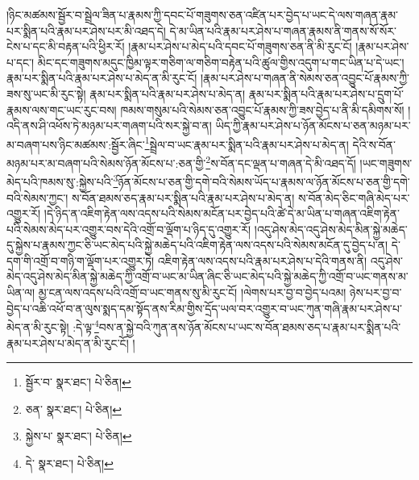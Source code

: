 །ཉིང་མཚམས་སྦྱོར་བ་སྦྲེལ་ཟིན་པ་རྣམས་ཀྱི་དབང་པོ་གཟུགས་ཅན་འཛིན་པར་བྱེད་པ་ཡང་དེ་ལས་གཞན་རྣམ་པར་སྨིན་པའི་རྣམ་པར་ཤེས་པར་མི་འཐད་དེ། དེ་མ་ཡིན་པའི་རྣམ་པར་ཤེས་པ་གཞན་རྣམས་ནི་གནས་སོ་སོར་ངེས་པ་དང་མི་བརྟན་པའི་ཕྱིར་རོ། །རྣམ་པར་ཤེས་པ་མེད་པའི་དབང་པོ་གཟུགས་ཅན་ནི་མི་རུང་ངོ། །རྣམ་པར་ཤེས་པ་དང་། མིང་དང་གཟུགས་མདུང་ཁྱིམ་ལྟར་གཅིག་ལ་གཅིག་བརྟེན་པའི་ཚུལ་གྱིས་འདུག་པ་གང་ཡིན་པ་དེ་ཡང་། རྣམ་པར་སྨིན་པའི་རྣམ་པར་ཤེས་པ་མེད་ན་མི་རུང་ངོ། །རྣམ་པར་ཤེས་པ་གཞན་ནི་སེམས་ཅན་འབྱུང་པོ་རྣམས་ཀྱི་ཟས་སུ་ཡང་མི་རུང་སྟེ། རྣམ་པར་སྨིན་པའི་རྣམ་པར་ཤེས་པ་མེད་ན། རྣམ་པར་སྨིན་པའི་རྣམ་པར་ཤེས་པ་དྲུག་པོ་རྣམས་ལས་གང་ཡང་རུང་བས། ཁམས་གསུམ་པའི་སེམས་ཅན་འབྱུང་པོ་རྣམས་ཀྱི་ཟས་བྱེད་པ་ནི་མི་དམིགས་སོ། །འདི་ནས་ཤི་འཕོས་ཏེ་མཉམ་པར་གཞག་པའི་སར་སྐྱེ་བ་ན། ཡིད་ཀྱི་རྣམ་པར་ཤེས་པ་ཉོན་མོངས་པ་ཅན་མཉམ་པར་མ་བཞག་པས་ཉིང་མཚམས་:སྦྱོར་ཞིང་\footnote{སྦྱོར་བ་  སྣར་ཐང་།  པེ་ཅིན། }སྦྲེལ་བ་ཡང་རྣམ་པར་སྨིན་པའི་རྣམ་པར་ཤེས་པ་མེད་ན། དེའི་ས་བོན་མཉམ་པར་མ་བཞག་པའི་སེམས་ཉོན་མོངས་པ་:ཅན་གྱི་\footnote{ཅན་  སྣར་ཐང་།  པེ་ཅིན། }ས་བོན་དང་ལྡན་པ་གཞན་དེ་མི་འཐད་དོ། །ཡང་གཟུགས་མེད་པའི་ཁམས་སུ་:སྐྱེས་པའི་\footnote{སྐྱེས་པ་  སྣར་ཐང་།  པེ་ཅིན། }ཉོན་མོངས་པ་ཅན་གྱི་དགེ་བའི་སེམས་ཡོད་པ་རྣམས་ལ་ཉོན་མོངས་པ་ཅན་གྱི་དགེ་བའི་སེམས་ཀྱང་། ས་བོན་ཐམས་ཅད་རྣམ་པར་སྨིན་པའི་རྣམ་པར་ཤེས་པ་མེད་ན། ས་བོན་མེད་ཅིང་གཞི་མེད་པར་འགྱུར་རོ། །དེ་ཉིད་ན་འཇིག་རྟེན་ལས་འདས་པའི་སེམས་མངོན་པར་བྱེད་པའི་ཚེ་དེ་མ་ཡིན་པ་གཞན་འཇིག་རྟེན་པའི་སེམས་མེད་པར་འགྱུར་བས་དེའི་འགྲོ་བ་ལྡོག་པ་ཉིད་དུ་འགྱུར་རོ། །འདུ་ཤེས་མེད་འདུ་ཤེས་མེད་མིན་སྐྱེ་མཆེད་དུ་སྐྱེས་པ་རྣམས་ཀྱང་ཅི་ཡང་མེད་པའི་སྐྱེ་མཆེད་པའི་འཇིག་རྟེན་ལས་འདས་པའི་སེམས་མངོན་དུ་བྱེད་པ་ན། དེ་དག་གི་འགྲོ་བ་གཉི་ག་ལྡོག་པར་འགྱུར་ཏེ། འཇིག་རྟེན་ལས་འདས་པའི་རྣམ་པར་ཤེས་པ་དེའི་གནས་ནི། འདུ་ཤེས་མེད་འདུ་ཤེས་མེད་མིན་སྐྱེ་མཆེད་ཀྱི་འགྲོ་བ་ཡང་མ་ཡིན་ཞིང་ཅི་ཡང་མེད་པའི་སྐྱེ་མཆེད་ཀྱི་འགྲོ་བ་ཡང་གནས་མ་ཡིན་ལ། མྱ་ངན་ལས་འདས་པའི་འགྲོ་བ་ཡང་གནས་སུ་མི་རུང་ངོ། །ལེགས་པར་བྱ་བ་བྱེད་པའམ། ཉེས་པར་བྱ་བ་བྱེད་པ་འཆི་འཕོ་བ་ན་ལུས་སྨད་དམ་སྟོད་ནས་རིམ་གྱིས་དྲོད་ཡལ་བར་འགྱུར་བ་ཡང་ཀུན་གཞི་རྣམ་པར་ཤེས་པ་མེད་ན་མི་རུང་སྟེ། :དེ་ལྟ་\footnote{དེ་  སྣར་ཐང་།  པེ་ཅིན། }བས་ན་སྐྱེ་བའི་ཀུན་ནས་ཉོན་མོངས་པ་ཡང་ས་བོན་ཐམས་ཅད་པ་རྣམ་པར་སྨིན་པའི་རྣམ་པར་ཤེས་པ་མེད་ན་མི་རུང་ངོ། །
